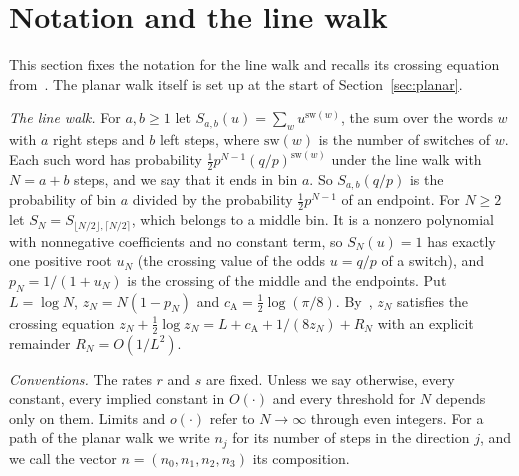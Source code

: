 \section{Notation and the line walk}\label{sec:notation}

This section fixes the notation for the line walk and recalls its crossing equation
from~\cite{paperA}. The planar walk itself is set up at the start of Section~\ref{sec:planar}.

\emph{The line walk.} For $a,b\ge1$ let $S_{a,b}(u)=\sum_wu^{\mathrm{sw}(w)}$, the sum
over the words $w$ with $a$ right steps and $b$ left steps, where $\mathrm{sw}(w)$ is the
number of switches of $w$. Each such word has probability
$\frac12p^{N-1}(q/p)^{\mathrm{sw}(w)}$ under the line walk with $N=a+b$ steps, and we say
that it ends in bin $a$. So
$S_{a,b}(q/p)$ is the probability of bin $a$ divided by the probability
$\frac12p^{N-1}$ of an endpoint. For $N\ge2$ let
$S_N=S_{\lfloor N/2\rfloor,\lceil N/2\rceil}$, which belongs to a middle bin.
It is a nonzero polynomial with nonnegative coefficients
and no constant term, so $S_N(u)=1$ has exactly one positive root $u_N$ (the crossing value of
the odds $u=q/p$ of a switch), and
$p_N=1/(1+u_N)$ is the crossing of the middle and the endpoints. Put $L=\log N$,
$z_N=N(1-p_N)$ and $c_{\mathrm A}=\frac12\log(\pi/8)$. By~\cite{paperA}, $z_N$ satisfies the crossing
equation $z_N+\frac12\log z_N=L+c_{\mathrm A}+1/(8z_N)+R_N$ with an explicit remainder
$R_N=O(1/L^2)$.

\emph{Conventions.} The rates $r$ and $s$ are fixed. Unless we say otherwise, every constant,
every implied constant in $O(\cdot)$ and every threshold for $N$ depends only on them. Limits
and $o(\cdot)$ refer to $N\to\infty$ through even integers. For a path of the planar walk we
write $n_j$ for its number of steps in the direction $j$, and we call the vector
$n=(n_0,n_1,n_2,n_3)$ its composition.
